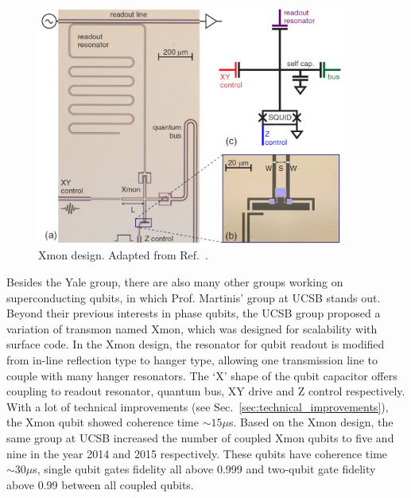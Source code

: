 \documentclass[%
groupedaddress,
showpacs,
 amsmath,amssymb,
 aps,
prb,
]{revtex4-1}
\begin{document}
            \begin{figure}[h]
                \centering
                \includegraphics[width=4in]{review/XmonDesign2013.png}
                \caption{Xmon design. Adapted from Ref.~.}
                \label{fig:XmonDesign2013}
            \end{figure}




Besides the Yale group, there are also many other groups working on superconducting qubits, in which Prof. Martinis' group at UCSB stands out. Beyond their previous interests in phase qubits, the UCSB group proposed a variation of transmon named Xmon\cite{Barends2013Coherent}, which was designed for scalability with surface code\cite{Fowler2012}. In the Xmon design, the resonator for qubit readout is modified from in-line reflection type to hanger type, allowing one transmission line to couple with many hanger resonators. The `X' shape of the qubit capacitor offers coupling to readout resonator, quantum bus, XY drive and Z control respectively. With a lot of technical improvements (see Sec.~\ref{sec:technical_improvements}), the Xmon qubit showed coherence time $\sim 15\mu$s. Based on the Xmon design, the same group at UCSB increased the number of coupled Xmon qubits to five\cite{Barends2014} and nine\cite{Kelly2015} in the year 2014 and 2015 respectively. These qubits have coherence time $\sim 30\mu$s, single qubit gates fidelity all above 0.999 and two-qubit gate fidelity above 0.99 between all coupled qubits.
\end{document}
